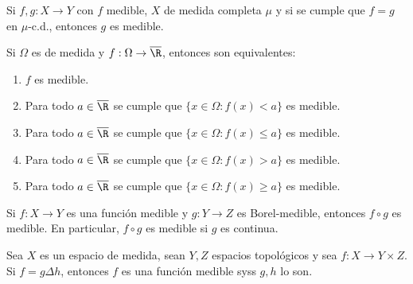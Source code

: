 \begin{prop}
	Si $f,g\colon X \to Y$ con $f$ medible, $X$ de medida completa $\mu$ y si se cumple que $f = g$ en $\mu$-c.d., entonces $g$ es medible.
\end{prop}

\begin{thm}
	Si $\Omega$ es de medida y $f:\Omega \to \overline\R$, entonces son equivalentes:
	\begin{enumerate}
		\item $f$ es medible.
		\item Para todo $a\in\overline\R$ se cumple que $\{ x\in\Omega : f(x) <   a \}$ es medible.
		\item Para todo $a\in\overline\R$ se cumple que $\{ x\in\Omega : f(x) \le a \}$ es medible.
		\item Para todo $a\in\overline\R$ se cumple que $\{ x\in\Omega : f(x) >   a \}$ es medible.
		\item Para todo $a\in\overline\R$ se cumple que $\{ x\in\Omega : f(x) \ge a \}$ es medible.
	\end{enumerate}
\end{thm}

\begin{prop}
	Si $f\colon X\to Y$ es una función medible y $g\colon Y\to Z$ es Borel-medible, entonces $f\circ g$ es medible.
	En particular, $f\circ g$ es medible si $g$ es continua.
\end{prop}

\begin{prop}
	Sea $X$ es un espacio de medida, sean $Y, Z$ espacios topológicos y sea $f\colon X \to Y\times Z$.
	Si $f = g \Delta h$, entonces $f$ es una función medible syss $g, h$ lo son.
\end{prop}

